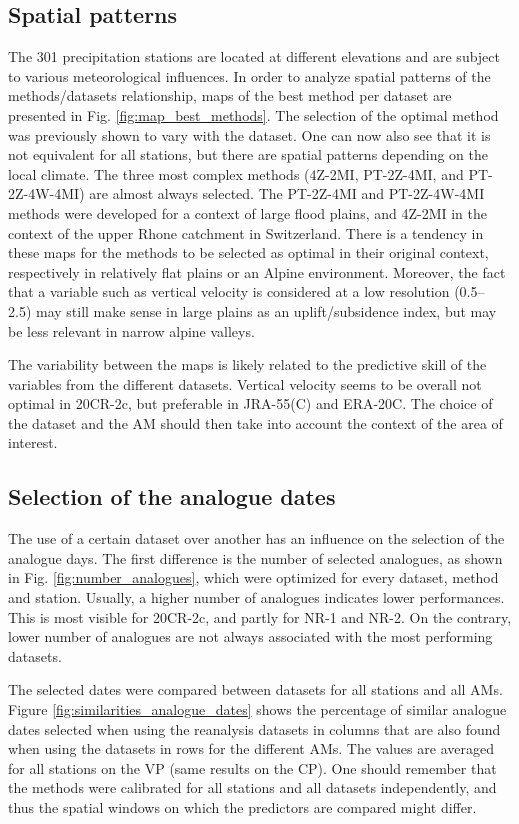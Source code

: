 \documentclass{ametsoc}
\begin{document}
\subsection{Spatial patterns}

The 301 precipitation stations are located at different elevations and are subject to various meteorological influences. In order to analyze spatial patterns of the methods/datasets relationship, maps of the best method per dataset are presented in Fig. \ref{fig:map_best_methods}. The selection of the optimal method was previously shown to vary with the dataset. One can now also see that it is not equivalent for all stations, but there are spatial patterns depending on the local climate. The three most complex methods (4Z-2MI, PT-2Z-4MI, and PT-2Z-4W-4MI) are almost always selected. The PT-2Z-4MI and PT-2Z-4W-4MI methods were developed for a context of large flood plains, and 4Z-2MI in the context of the upper Rhone catchment in Switzerland. There is a tendency in these maps for the methods to be selected as optimal in their original context, respectively in relatively flat plains or an Alpine environment. Moreover, the fact that a variable such as vertical velocity is considered at a low resolution (0.5\degree -- 2.5\degree) may still make sense in large plains as an uplift/subsidence index, but may be less relevant in narrow alpine valleys. 

The variability between the maps is likely related to the predictive skill of the variables from the different datasets. Vertical velocity seems to be overall not optimal in 20CR-2c, but preferable in JRA-55(C) and ERA-20C. The choice of the dataset and the AM should then take into account the context of the area of interest.


\subsection{Selection of the analogue dates}

The use of a certain dataset over another has an influence on the selection of the analogue days. The first difference is the number of selected analogues, as shown in Fig. \ref{fig:number_analogues}, which were optimized for every dataset, method and station. Usually, a higher number of analogues indicates lower performances. This is most visible for 20CR-2c, and partly for NR-1 and NR-2. On the contrary, lower number of analogues are not always associated with the most performing datasets.

The selected dates were compared between datasets for all stations and all AMs. Figure \ref{fig:similarities_analogue_dates} shows the percentage of similar analogue dates selected when using the reanalysis datasets in columns that are also found when using the datasets in rows for the different AMs. The values are averaged for all stations on the VP (same results on the CP). One should remember that the methods were calibrated for all stations and all datasets independently, and thus the spatial windows on which the predictors are compared might differ.
\end{document}
